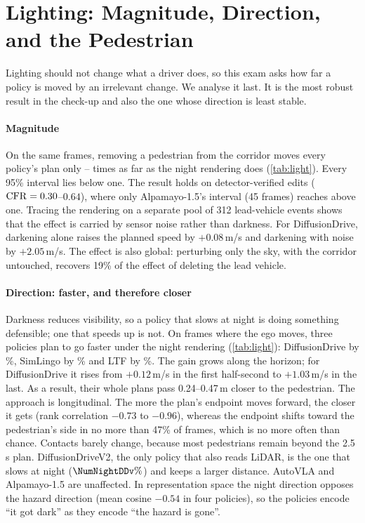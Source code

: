 \section{Lighting: Magnitude, Direction, and the Pedestrian}
\label{sec:lighting}



Lighting should not change what a driver does, so this exam asks how far a policy is moved by an
irrelevant change. We analyse it last. It is the most robust result in the check-up and also the one
whose direction is least stable.

\paragraph{Magnitude}
On the same frames, removing a pedestrian from the corridor moves every policy's plan only
\NumCFRlo--\NumCFRhi{} times as far as the night rendering does (\cref{tab:light}). Every 95\%
interval lies below one. The result holds on detector-verified edits ($\mathrm{CFR}=0.30$--$0.64$), where only Alpamayo-1.5's interval
(45 frames) reaches above one. Tracing the rendering on a separate pool of 312 lead-vehicle events
shows that the effect is carried by sensor noise rather than darkness. For DiffusionDrive, darkening
alone raises the planned speed by $+0.08$\,m/s and darkening with noise by $+2.05$\,m/s. The effect is
also global: perturbing only the sky, with the corridor untouched, recovers 19\% of the effect of
deleting the lead vehicle.

\paragraph{Direction: faster, and therefore closer}
Darkness reduces visibility, so a policy that slows at night is doing something defensible; one that
speeds up is not. On frames where the ego moves, three policies plan to go faster under the night
rendering (\cref{tab:light}): DiffusionDrive by \NumNightDD\%, SimLingo by \NumNightSL\% and LTF by
\NumNightLTF\%. The gain grows along the horizon; for DiffusionDrive it rises from $+0.12$\,m/s in the
first half-second to $+1.03$\,m/s in the last. As a result, their whole plans pass 0.24--0.47\,m closer
to the pedestrian. The approach is longitudinal. The more the plan's endpoint moves forward, the closer
it gets (rank correlation $-0.73$ to $-0.96$), whereas the endpoint shifts toward the pedestrian's side
in no more than 47\% of frames, which is no more often than chance. Contacts barely change,
because most pedestrians remain beyond the 2.5\,s plan. DiffusionDriveV2, the only policy that also
reads LiDAR, is the one that slows at night ($\NumNightDDv\%$) and keeps a larger distance.
AutoVLA and Alpamayo-1.5 are unaffected. In representation space the night direction opposes the
hazard direction (mean cosine $-0.54$ in four policies), so the policies encode ``it got dark''
as they encode ``the hazard is gone''.


